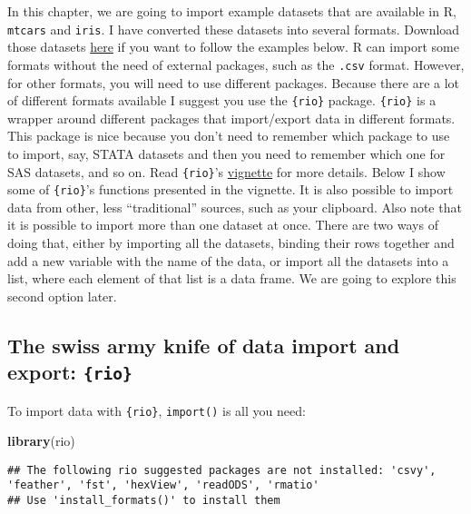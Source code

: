 \documentclass[
]{article}
\newenvironment{Shaded}{\begin{snugshade}}{\end{snugshade}}
\newcommand{\KeywordTok}[1]{\textcolor[rgb]{0.13,0.29,0.53}{\textbf{#1}}}
\newcommand{\NormalTok}[1]{#1}
\begin{document}
In this chapter, we are going to import example datasets that are available in R, \texttt{mtcars} and
\texttt{iris}. I have converted these datasets into several formats. Download those datasets
\href{https://github.com/b-rodrigues/modern_R/tree/master/datasets}{here} if you want to follow the
examples below. R can import some formats without the need of external packages, such as the \texttt{.csv}
format. However, for other formats, you will need to use different packages. Because there are a
lot of different formats available I suggest you use the \texttt{\{rio\}} package.
\texttt{\{rio\}} is a wrapper around different packages that import/export data in different formats.
This package is nice because you don't need to remember which package to use to import, say,
STATA datasets and then you need to remember which one for SAS datasets, and so on. Read \texttt{\{rio\}}'s
\href{https://cran.r-project.org/web/packages/rio/vignettes/rio.html}{vignette} for more details. Below
I show some of \texttt{\{rio\}}'s functions presented in the vignette. It is also possible to import data from
other, less ``traditional'' sources, such as your clipboard. Also note that it is possible to import
more than one dataset at once. There are two ways of doing that, either by importing all the
datasets, binding their rows together and add a new variable with the name of the data, or import
all the datasets into a list, where each element of that list is a data frame. We are going to
explore this second option later.

\hypertarget{the-swiss-army-knife-of-data-import-and-export-rio}{%
\subsection{\texorpdfstring{The swiss army knife of data import and export: \texttt{\{rio\}}}{The swiss army knife of data import and export: \{rio\}}}\label{the-swiss-army-knife-of-data-import-and-export-rio}}

To import data with \texttt{\{rio\}}, \texttt{import()} is all you need:

\begin{Shaded}
\begin{Highlighting}[]
\KeywordTok{library}\NormalTok{(rio)}
\end{Highlighting}
\end{Shaded}

\begin{verbatim}
## The following rio suggested packages are not installed: 'csvy', 'feather', 'fst', 'hexView', 'readODS', 'rmatio'
## Use 'install_formats()' to install them
\end{verbatim}
\end{document}
